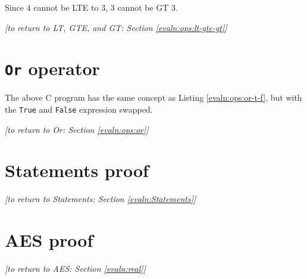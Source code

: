     
    Since 4 cannot be LTE to 3, 3 cannot be GT 3.
    \\
    
    \begin{flushright}
        \textit{[to return to LT, GTE, and GT: Section \ref{evaln:ops:lt-gte-gt}]}
    \end{flushright}

\newpage


\section{\texttt{Or} operator}\label{app:evaln:ops:or}
    
    
    The above C program has the same concept as Listing \ref{evaln:ops:or-t-f}, but with the \texttt{True} and \texttt{False} expression swapped.
    \\
    
    \begin{flushright}
        \textit{[to return to Or: Section \ref{evaln:ops:or}]}
    \end{flushright}

\newpage


\section{Statements proof}\label{app:stmts}
    
    \begin{flushright}
        \textit{[to return to Statements: Section \ref{evaln:Statements}]}
    \end{flushright}
    
    
\newpage


\section{AES proof}\label{app:aes}

    \begin{flushright}
        \textit{[to return to AES: Section \ref{evaln:real}]}
    \end{flushright}
    